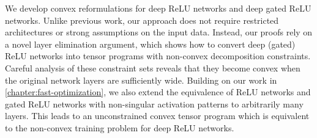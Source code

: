 
We develop convex reformulations for deep ReLU networks and deep gated ReLU
networks.
Unlike previous work, our approach does not require restricted architectures
or strong assumptions on the input data.
Instead, our proofs rely on a novel layer elimination argument, which shows how
to convert deep (gated) ReLU networks into tensor programs with non-convex
decomposition constraints.
Careful analysis of these constraint sets reveals that they become convex
when the original network layers are sufficiently wide.
Building on our work in \cref{chapter:fast-optimization}, we also extend the
equivalence of ReLU networks and gated ReLU networks with non-singular
activation patterns to arbitrarily many layers.
This leads to an unconstrained convex tensor program which is equivalent
to the non-convex training problem for deep ReLU networks.

